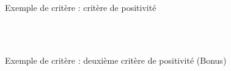 
\begin{frame}{Exemple de critère : critère de positivité}

\hspace{4cm}\\
\vspace{5cm}
\hspace{4cm}\\

\end{frame}



\begin{frame}{Exemple de critère : deuxième critère de positivité (Bonus)}



\end{frame}
